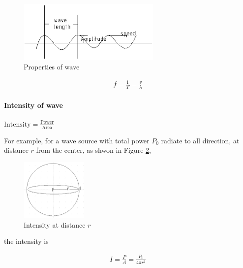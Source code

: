             \begin{figure}[H]
                \begin{center}
                    \includegraphics[height=3cm]{wave_charts/wave_prop.eps}
                \end{center}
                \caption{Properties of wave}
                \label{wave_prop}
            \end{figure}

            \begin{align}
                f = \frac{1}{T} = \frac{v}{\lambda}
            \end{align}

        \paragraph{Intensity of wave}
            $\mbox{Intensity} = \frac{\mbox{Power}}{\mbox{Area}}$

            For example, for a wave source with total power $P_0$ radiate to all direction, at distance $r$ from the center, as shwon in Figure \ref{ball_int},
            \begin{figure}[H]
                \begin{center}
                    \includegraphics[height=3cm]{wave_charts/ball_intensity.eps}
                \end{center}
                \caption{Intensity at distance $r$}
                \label{ball_int}
            \end{figure}
            
            
            the intensity is

            \begin{align}
                I = \frac{P}{A} = \frac{P_0}{4 \pi r^2}
            \end{align}

